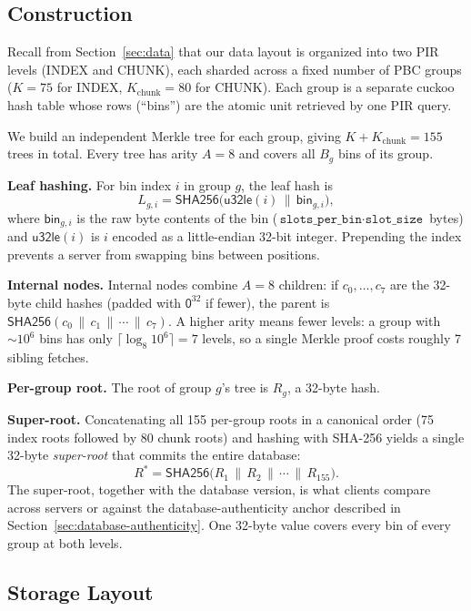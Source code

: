 \subsection{Construction}

Recall from Section~\ref{sec:data} that our data layout is organized into two PIR levels (INDEX and CHUNK), each sharded across a fixed number of PBC groups (\mbox{$K{=}75$} for INDEX, \mbox{$K_\text{chunk}{=}80$} for CHUNK). Each group is a separate cuckoo hash table whose rows (``bins'') are the atomic unit retrieved by one PIR query.

We build an independent Merkle tree for each group, giving $K + K_\text{chunk} = 155$ trees in total. Every tree has arity $A = 8$ and covers all $B_g$ bins of its group.

\textbf{Leaf hashing.} For bin index $i$ in group $g$, the leaf hash is
$$L_{g,i} = \mathsf{SHA256}\bigl(\mathsf{u32le}(i) \,\|\, \mathsf{bin}_{g,i}\bigr),$$
where $\mathsf{bin}_{g,i}$ is the raw byte contents of the bin ($\texttt{slots\_per\_bin} \cdot \texttt{slot\_size}$ bytes) and $\mathsf{u32le}(i)$ is $i$ encoded as a little-endian 32-bit integer. Prepending the index prevents a server from swapping bins between positions.

\textbf{Internal nodes.} Internal nodes combine $A = 8$ children: if $c_0, \ldots, c_7$ are the 32-byte child hashes (padded with $\mathsf{0}^{32}$ if fewer), the parent is $\mathsf{SHA256}(c_0 \,\|\, c_1 \,\|\, \cdots \,\|\, c_7)$. A higher arity means fewer levels: a group with $\sim\!10^6$ bins has only $\lceil \log_8 10^6 \rceil = 7$ levels, so a single Merkle proof costs roughly 7 sibling fetches.

\textbf{Per-group root.} The root of group $g$'s tree is $R_g$, a 32-byte hash.

\textbf{Super-root.} Concatenating all 155 per-group roots in a canonical order (75 index roots followed by 80 chunk roots) and hashing with SHA-256 yields a single 32-byte \emph{super-root} that commits the entire database:
$$R^* = \mathsf{SHA256}\bigl(R_1 \,\|\, R_2 \,\|\, \cdots \,\|\, R_{155}\bigr).$$
The super-root, together with the database version, is what clients compare across servers or against the database-authenticity anchor described in Section~\ref{sec:database-authenticity}. One 32-byte value covers every bin of every group at both levels.

\subsection{Storage Layout}
\label{sec:merkle-storage}

